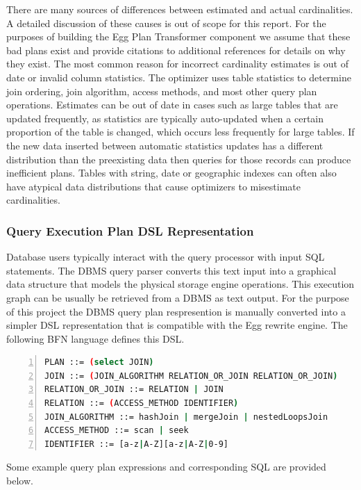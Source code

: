 \documentclass{article}
\begin{document}
There are many sources of differences between estimated and actual cardinalities. 
A detailed discussion of these causes is out of scope for this report.  For the 
purposes of building the Egg Plan Transformer component we assume that these bad plans exist
and provide citations to additional references for details on why they exist. \cite{Fritchey:2014} 
The most common reason for incorrect cardinality estimates is out of date or invalid column statistics.
The optimizer uses table statistics to determine join ordering, join algorithm, access methods,
and most other query plan operations.  Estimates can be out of date in cases such as large
tables that are updated frequently, as statistics are typically auto-updated when a certain proportion of the 
table is changed, which occurs less frequently for large tables.  If the new data inserted between automatic statistics
updates has a different distribution than the preexisting data then queries for those records can produce inefficient plans.
Tables with string, date or geographic indexes can often also have atypical data distributions that cause 
optimizers to misestimate cardinalities.

\subsubsection*{Query Execution Plan DSL Representation}
Database users typically interact with the query processor with input SQL statements.  The DBMS query parser
converts this text input into a graphical data structure that models the physical storage engine operations.
This execution graph can be usually be retrieved from a DBMS as text output.  For the purpose of this project the DBMS
query plan respresention is manually converted into a simpler DSL representation that is compatible with
the Egg rewrite engine.  The following BFN language defines this DSL.

\begin{lstlisting}[language=bash,
    frame=single, numbers=left, numbersep=5pt, numberstyle=\tiny\color{mygray},]
PLAN ::= (select JOIN)
JOIN ::= (JOIN_ALGORITHM RELATION_OR_JOIN RELATION_OR_JOIN)
RELATION_OR_JOIN ::= RELATION | JOIN
RELATION ::= (ACCESS_METHOD IDENTIFIER)
JOIN_ALGORITHM ::= hashJoin | mergeJoin | nestedLoopsJoin
ACCESS_METHOD ::= scan | seek
IDENTIFIER ::= [a-z|A-Z][a-z|A-Z|0-9]
\end{lstlisting}

Some example query plan expressions and corresponding SQL are provided below.
\end{document}
